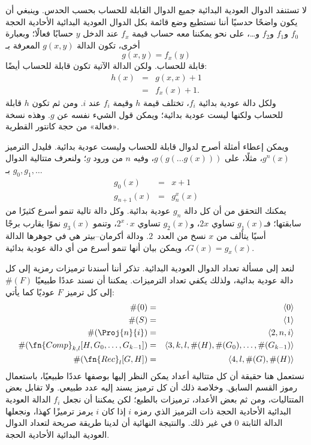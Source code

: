 \documentclass[../../../include/open-logic-section]{subfiles}
\begin{document}

لا تستنفد الدوال العودية البدائية جميع الدوال القابلة للحساب بحسب
الحدس. وينبغي أن يكون واضحًا حدسيًا أننا نستطيع وضع قائمة بكل الدوال
العودية البدائية الأحادية الحجة $f_0$ و$f_1$ و$f_2$ و…، على نحو
يمكننا معه حساب قيمة $f_x$ عند الدخل $y$ حسابًا فعالًا؛ وبعبارة أخرى،
تكون الدالة $g(x,y)$ المعرفة بـ
\[
g(x,y) = f_x(y)
\]
قابلة للحساب. ولكن الدالة الآتية تكون قابلة للحساب أيضًا:
\begin{eqnarray*}
h(x) & = & g(x,x) + 1 \\
& = & f_x(x) +1.
\end{eqnarray*}
ولكل دالة عودية بدائية $f_i$، تختلف قيمة $h$ وقيمة $f_i$ عند $i$. ومن ثم
تكون $h$ قابلة للحساب ولكنها ليست عودية بدائية؛ ويمكن قول الشيء نفسه
عن $g$. وهذه نسخة «فعالة» من حجة كانتور القطرية.

ويمكن إعطاء أمثلة أصرح لدوال قابلة للحساب وليست عودية بدائية. فليدل
الترميز $g^n(x)$، مثلًا، على $g(g(\dots g(x)))$، وفيه $n$ من ورود
$g$؛ ولنعرف متتالية الدوال $g_0,g_1,\dots$ بـ
\begin{eqnarray*}
g_0(x) & = & x+1 \\
g_{n + 1}(x) & = & g_n^x(x)
\end{eqnarray*}
يمكنك التحقق من أن كل دالة $g_n$ عودية بدائية. وكل دالة تالية تنمو
أسرع كثيرًا من سابقتها؛ فـ$g_1(x)$ تساوي $2x$، و$g_2(x)$ تساوي
$2^x\cdot x$، وتنمو $g_3(x)$ نموًا يقارب برجًا أسيًا يتألف من $x$
نسخ من العدد~$2$. ودالة أكرمان--بيتر هي في جوهرها الدالة $G(x)=g_x(x)$،
ويمكن بيان أنها تنمو أسرع من أي دالة عودية بدائية.

لنعد إلى مسألة تعداد الدوال العودية البدائية. تذكر أننا أسندنا
ترميزات رمزية إلى كل دالة عودية بدائية، ولذلك يكفي تعداد الترميزات.
يمكننا أن نسند عددًا طبيعيًا $\#(F)$ إلى كل ترميز $F$ عوديًا كما يأتي:
\begin{eqnarray*}
\#(0) & = & \langle 0 \rangle \\
\#(S) & = & \langle 1 \rangle \\
\#(\Proj{n}{i}) & = & \langle 2, n, i \rangle \\
\#(\fn{Comp}_{k,l}[H,G_0,\dots,G_{k-1}]) & = & \langle
3,k,l,\#(H),\#(G_0),\dots,\#(G_{k-1}) \rangle \\
\#(\fn{Rec}_l[G,H]) & = & \langle 4, l, \#(G), \#(H) \rangle
\end{eqnarray*}
نستعمل هنا حقيقة أن كل متتالية أعداد يمكن النظر إليها بوصفها عددًا
طبيعيًا، باستعمال رموز القسم السابق. وخلاصة ذلك أن كل ترميز يسند إليه
عدد طبيعي. ولا تقابل بعض المتتاليات، ومن ثم بعض الأعداد، ترميزات
بالطبع؛ لكن يمكننا أن نجعل $f_i$ الدالة العودية البدائية الأحادية
الحجة ذات الترميز الذي رمزه $i$ إذا كان $i$ يرمز ترميزًا كهذا، ونجعلها
الدالة الثابتة $0$ في غير ذلك. والنتيجة النهائية أن لدينا طريقة صريحة
لتعداد الدوال العودية البدائية الأحادية الحجة.
\end{document}
